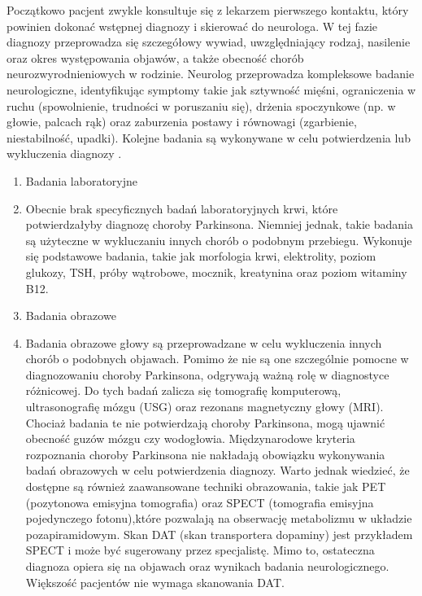 Początkowo pacjent zwykle konsultuje się z lekarzem pierwszego kontaktu, który powinien dokonać wstępnej diagnozy i skierować do neurologa.
W tej fazie diagnozy przeprowadza się szczegółowy wywiad, uwzględniający rodzaj, nasilenie oraz okres występowania objawów, a także
obecność chorób neurozwyrodnieniowych w rodzinie.
Neurolog przeprowadza kompleksowe badanie neurologiczne, identyfikując symptomy takie jak sztywność mięśni, ograniczenia w
ruchu (spowolnienie, trudności w poruszaniu się), drżenia spoczynkowe (np. w głowie, palcach rąk) oraz zaburzenia postawy i równowagi
(zgarbienie, niestabilność, upadki). Kolejne badania są wykonywane w celu potwierdzenia lub wykluczenia diagnozy \cite{diagnostyka_Sitek, Loscalzo_2022}.

\renewcommand{\labelenumi}{\alph{enumi})}
\begin{enumerate}
	\item Badania laboratoryjne
	\item[] Obecnie brak specyficznych badań laboratoryjnych krwi, które potwierdzałyby diagnozę choroby Parkinsona.
Niemniej jednak, takie badania są użyteczne w wykluczaniu innych chorób o podobnym przebiegu.
Wykonuje się podstawowe badania, takie jak morfologia krwi, elektrolity, poziom glukozy, TSH, próby wątrobowe, mocznik, kreatynina oraz poziom witaminy B12.

	\item Badania obrazowe
	\item[] Badania obrazowe głowy są przeprowadzane w celu wykluczenia innych chorób o podobnych objawach.
Pomimo że nie są one szczególnie pomocne w diagnozowaniu choroby Parkinsona, odgrywają ważną rolę w diagnostyce różnicowej.
Do tych badań zalicza się tomografię komputerową, ultrasonografię mózgu (USG) oraz rezonans magnetyczny głowy (MRI). Chociaż badania te nie potwierdzają choroby Parkinsona, mogą ujawnić obecność guzów mózgu czy wodogłowia.
Międzynarodowe kryteria rozpoznania choroby Parkinsona nie nakładają obowiązku wykonywania badań obrazowych w celu potwierdzenia diagnozy.
Warto jednak wiedzieć, że dostępne są również zaawansowane techniki obrazowania, takie jak PET (pozytonowa emisyjna tomografia) oraz SPECT (tomografia emisyjna pojedynczego fotonu),które pozwalają na obserwację metabolizmu w układzie pozapiramidowym. Skan DAT (skan transportera dopaminy) jest przykładem SPECT i może być sugerowany przez specjalistę.
Mimo to, ostateczna diagnoza opiera się na objawach oraz wynikach badania neurologicznego. Większość pacjentów nie wymaga skanowania DAT.


\end{enumerate}
